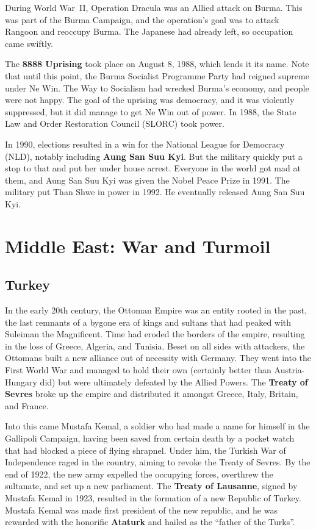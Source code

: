 During World War~II, Operation Dracula was an Allied attack on Burma.
This was part of the Burma Campaign, and the operation's goal was to attack Rangoon and reoccupy Burma.
The Japanese had already left, so occupation came swiftly.

The \textbf{8888 Uprising} took place on August 8, 1988, which lends it its name.
Note that until this point, the Burma Socialist Programme Party had reigned supreme under Ne Win.
The Way to Socialism had wrecked Burma's economy, and people were not happy.
The goal of the uprising was democracy, and it was violently suppressed,
but it did manage to get Ne Win out of power.
In 1988, the State Law and Order Restoration Council (SLORC) took power.

In 1990, elections resulted in a win for the National League for Democracy (NLD),
notably including \textbf{Aung San Suu Kyi}.
But the military quickly put a stop to that and put her under house arrest.
Everyone in the world got mad at them, and Aung San Suu Kyi was given the Nobel Peace Prize in 1991.
The military put Than Shwe in power in 1992.
He eventually released Aung San Suu Kyi.

\section{Middle East: War and Turmoil}

\subsection*{Turkey}

In the early 20th century, the Ottoman Empire was an entity rooted in the past,
the last remnants of a bygone era of kings and sultans that had peaked with Suleiman the Magnificent.
Time had eroded the borders of the empire, resulting in the loss of Greece, Algeria, and Tunisia.
Beset on all sides with attackers, the Ottomans built a new alliance out of necessity with Germany.
They went into the First World War and managed to hold their own (certainly better than Austria-Hungary did)
but were ultimately defeated by the Allied Powers.
The \textbf{Treaty of Sevres} broke up the empire and distributed it amongst Greece, Italy, Britain, and France.

Into this came Mustafa Kemal, a soldier who had made a name for himself in the Gallipoli Campaign,
having been saved from certain death by a pocket watch that had blocked a piece of flying shrapnel.
Under him, the Turkish War of Independence raged in the country, aiming to revoke the Treaty of Sevres.
By the end of 1922, the new army expelled the occupying forces, overthrew the sultanate,
and set up a new parliament.
The \textbf{Treaty of Lausanne}, signed by Mustafa Kemal in 1923,
resulted in the formation of a new Republic of Turkey.
Mustafa Kemal was made first president of the new republic,
and he was rewarded with the honorific \textbf{Ataturk} and hailed as the ``father of the Turks''.

